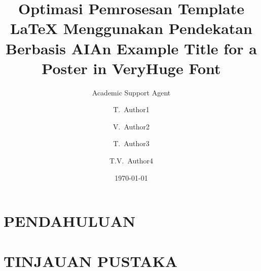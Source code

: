 \documentclass{a0poster}
\title{Optimasi Pemrosesan Template LaTeX Menggunakan Pendekatan Berbasis AI}
\author{Academic Support Agent}
\date{\today}
\begin{document}
\maketitle

\begin{abstract}

\end{abstract}

\chapter{PENDAHULUAN}


\chapter{TINJAUAN PUSTAKA}


\usepackage{triumfposter}

\usepackage{lipsum}
\usepackage{float}
\usepackage{multicol}
\columnsep=60pt %
\columnseprule=0pt %
\usepackage{amsfonts, amsmath, amsthm, amssymb} %

\title{An Example Title for a Poster in VeryHuge Font}


\author[1]{T.~Author1}
\author[2]{V.~Author2}
\author[1]{T.~Author3}
\author[1,2]{T.V.~Author4}
\date{\vspace{-5ex}}
\end{document}

